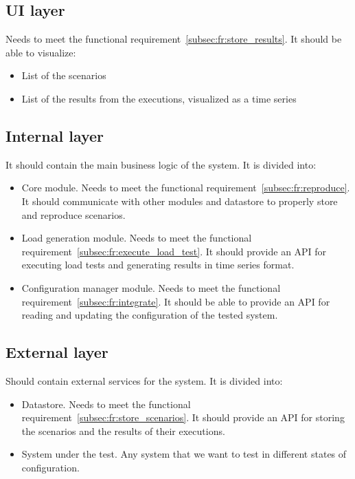 \subsection{UI layer}\label{subsec:ui_layer}
Needs to meet the functional requirement~\ref{subsec:fr:store_results}.
It should be able to visualize:
\begin{itemize}
    \item List of the scenarios
    \item List of the results from the executions, visualized as a time series
\end{itemize}

\subsection{Internal layer}\label{subsec:internal_layer}
It should contain the main business logic of the system. It is divided into:
\begin{itemize}
    \item Core module. Needs to meet the functional requirement~\ref{subsec:fr:reproduce}. It should communicate with other modules and datastore to properly store and reproduce scenarios.
    \item Load generation module. Needs to meet the functional requirement~\ref{subsec:fr:execute_load_test}. It should provide an API for executing load tests and generating results in time series format.
    \item Configuration manager module. Needs to meet the functional requirement~\ref{subsec:fr:integrate}. It should be able to provide an API for reading and updating the configuration of the tested system.
\end{itemize}

\subsection{External layer}\label{subsec:external_layer}
Should contain external services for the system. It is divided into:
\begin{itemize}
    \item Datastore. Needs to meet the functional requirement~\ref{subsec:fr:store_scenarios}. It should provide an API for storing the scenarios and the results of their executions.
    \item System under the test. Any system that we want to test in different states of configuration.
\end{itemize}